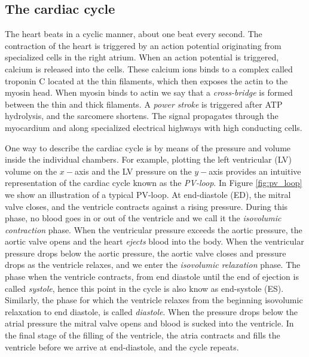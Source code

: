 \subsection{The cardiac cycle}
\label{sec:cardiac_cycle}

The heart beats in a cyclic manner, about one beat every second.
The contraction of the heart is triggered by an action
potential originating from specialized cells in the right atrium. When an action
potential is triggered, calcium is released into the cells. These
calcium ions binds to a complex called troponin C located at the thin
filaments, which then exposes the actin to the myosin head. When
myosin binds to actin we say that a \emph{cross-bridge} is formed
between the thin and thick filaments. A \emph{power stroke} is
triggered after ATP hydrolysis, and the sarcomere shortens. 
The signal propagates through the myocardium and along
specialized electrical highways with high conducting cells.

One way to describe the cardiac cycle is by means of
the pressure and volume inside the individual chambers. For example, plotting
the left ventricular (LV) volume on the $x-$axis and the LV pressure on the $y-$axis
provides an intuitive representation of the cardiac cycle known as the
\emph{PV-loop}. In Figure \ref{fig:pv_loop} we show an illustration of
a typical PV-loop. At end-diastole (ED), the mitral valve closes, and
the ventricle contracts against a rising pressure. During this phase,
no blood goes in or out of the ventricle and we call it the
\emph{isovolumic contraction} phase. When the
ventricular pressure exceeds the aortic pressure, the aortic valve
opens and the heart \emph{ejects} blood into the body. When the ventricular
pressure drops below the aortic pressure, the aortic valve closes and
pressure drops as the ventricle relaxes, and we enter the
\emph{isovolumic relaxation} phase. The phase when the ventricle
contracts, from end diastole until the end of ejection is called
\emph{systole}, hence this point in the cycle is also know as
end-systole (ES). Similarly, the phase for which the ventricle
relaxes from the beginning isovolumic relaxation to end diastole, is
called \emph{diastole}. When the pressure drops below the atrial pressure 
the mitral valve opens and blood is sucked into the ventricle. In the
final stage of the filling of the ventricle, the atria contracts and
fills the ventricle before we arrive at end-diastole, and the cycle
repeats. 


